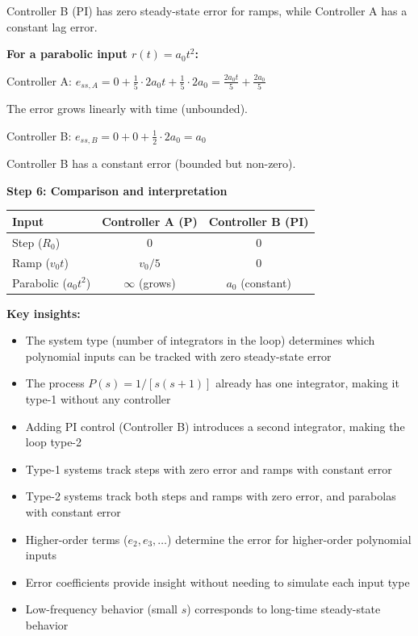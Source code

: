 \documentclass[11pt,a4paper]{article}
\begin{document}
Controller B (PI) has zero steady-state error for ramps, while Controller A has a constant lag error.

\textbf{For a parabolic input $r(t) = a_0 t^2$:}

Controller A: $e_{ss,A} = 0 + \frac{1}{5} \cdot 2a_0 t + \frac{1}{5} \cdot 2a_0 = \frac{2a_0 t}{5} + \frac{2a_0}{5}$

The error grows linearly with time (unbounded).

Controller B: $e_{ss,B} = 0 + 0 + \frac{1}{2} \cdot 2a_0 = a_0$

Controller B has a constant error (bounded but non-zero).

\textbf{Step 6: Comparison and interpretation}

\begin{center}
\begin{tabular}{|l|c|c|}
\hline
\textbf{Input} & \textbf{Controller A (P)} & \textbf{Controller B (PI)} \\
\hline
Step ($R_0$) & 0 & 0 \\
Ramp ($v_0 t$) & $v_0/5$ & 0 \\
Parabolic ($a_0 t^2$) & $\infty$ (grows) & $a_0$ (constant) \\
\hline
\end{tabular}
\end{center}

\textbf{Key insights:}
\begin{itemize}
\item The system type (number of integrators in the loop) determines which polynomial inputs can be tracked with zero steady-state error
\item The process $P(s) = 1/[s(s+1)]$ already has one integrator, making it type-1 without any controller
\item Adding PI control (Controller B) introduces a second integrator, making the loop type-2
\item Type-1 systems track steps with zero error and ramps with constant error
\item Type-2 systems track both steps and ramps with zero error, and parabolas with constant error
\item Higher-order terms ($e_2, e_3, \ldots$) determine the error for higher-order polynomial inputs
\item Error coefficients provide insight without needing to simulate each input type
\item Low-frequency behavior (small $s$) corresponds to long-time steady-state behavior
\end{itemize}
\end{document}
